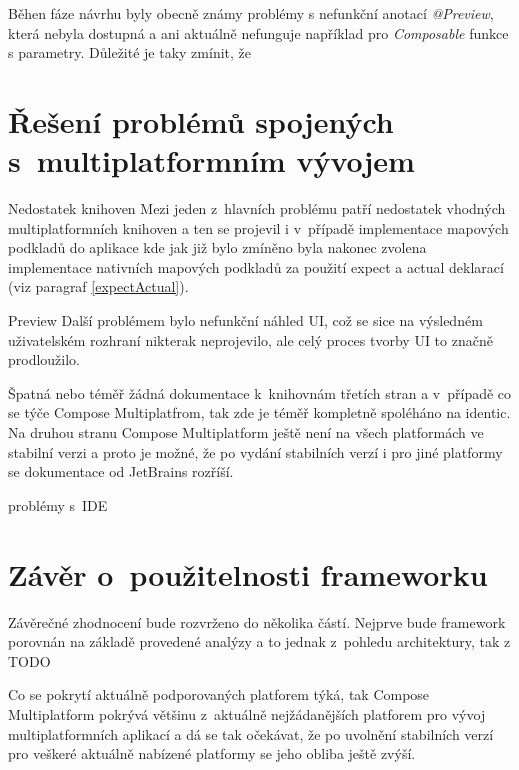 Běhen fáze návrhu byly obecně známy problémy s nefunkční anotací \textit{@Preview}, která nebyla dostupná a ani aktuálně nefunguje například pro 
\textit{Composable} funkce s parametry. \cite{previewCompose} Důležité je taky zmínit, že 

\section{Řešení problémů spojených s~multiplatformním vývojem} %
Nedostatek knihoven
Mezi jeden z~hlavních problému patří nedostatek vhodných multiplatformních knihoven a ten se projevil i v~případě implementace mapových podkladů
do aplikace kde jak již bylo zmíněno byla nakonec zvolena implementace nativních mapových podkladů za použití expect a actual deklarací (viz paragraf \ref{expectActual}).

Preview
Další problémem bylo nefunkční náhled UI, což se sice na výsledném uživatelském rozhraní nikterak neprojevilo, ale celý proces tvorby UI to značně 
prodloužilo.

Špatná nebo téměř žádná dokumentace k~knihovnám třetích stran a v~případě co se týče Compose Multiplatfrom, tak zde je téměř kompletně spoléháno na
identic. 
Na druhou stranu Compose Multiplatform ještě není na všech platformách ve stabilní verzi a proto je možné, že po vydání stabilních verzí i pro jiné
platformy se dokumentace od JetBrains rozříší.

problémy s~IDE 

\section{Závěr o~použitelnosti frameworku}
Závěrečné zhodnocení bude rozvrženo do několika částí. Nejprve bude framework porovnán na základě provedené analýzy a to jednak 
z~pohledu architektury, tak z TODO


Co se pokrytí aktuálně podporovaných platforem týká, tak Compose Multiplatform pokrývá většinu z~aktuálně nejžádanějších platforem pro 
vývoj multiplatformních aplikací a dá se tak očekávat, že po uvolnění stabilních verzí pro veškeré aktuálně nabízené platformy se 
jeho obliba ještě zvýší. 



